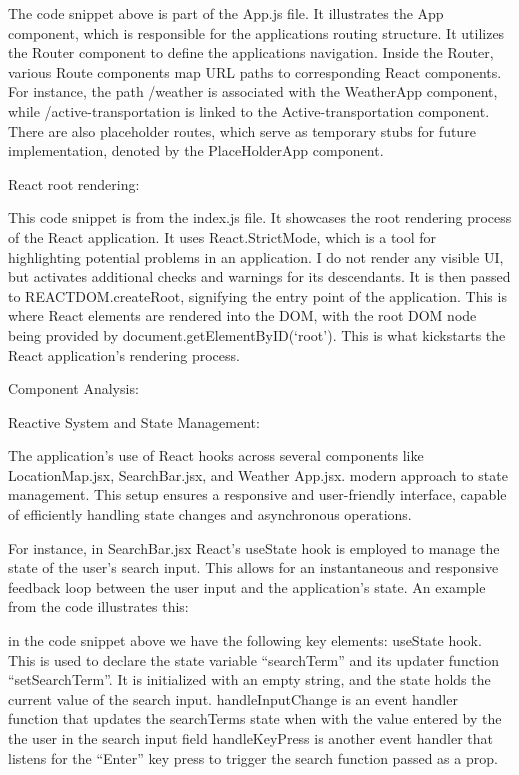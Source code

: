 The code snippet above is part of the App.js file. It illustrates the App component, which is responsible for the applications routing structure. It utilizes the Router component to define the applications navigation. Inside the Router, various Route components map URL paths to corresponding React components. For instance, the path /weather is associated with the WeatherApp component, while /active-transportation is linked to the Active-transportation component. There are also placeholder routes, which serve as temporary stubs for future implementation, denoted by the PlaceHolderApp component.

React root rendering: 


This code snippet is from the index.js file. It showcases the root rendering process of the React application. It uses React.StrictMode, which is a tool for highlighting potential problems in an application. I do not render any visible UI, but activates additional checks and warnings for its descendants. It is then passed to REACTDOM.createRoot, signifying the entry point of the application. This is where React elements are rendered into the DOM, with the root DOM node being provided by document.getElementByID(‘root’). This is what kickstarts the React application’s rendering process. 


Component Analysis: 

Reactive System and State Management:

The application's use of React hooks across several components like LocationMap.jsx, SearchBar.jsx, and Weather App.jsx. modern approach to state management. This setup ensures a responsive and user-friendly interface, capable of efficiently handling state changes and asynchronous operations.

For instance, in SearchBar.jsx React's useState  hook is employed to manage the state of the user's search input. This allows for an instantaneous and responsive feedback loop between the user input and the application's state. An example from the code illustrates this:


in the code snippet above we have the following key elements: 
useState hook. This is used to declare the state variable “searchTerm” and its updater function “setSearchTerm”. It is initialized with an empty string, and the state holds the current value of the search input. 
handleInputChange is an event handler function that updates the searchTerms state when with the value entered by the the user in the search input field
handleKeyPress is another event handler that listens for the “Enter” key press to trigger the search function passed as a prop. 

